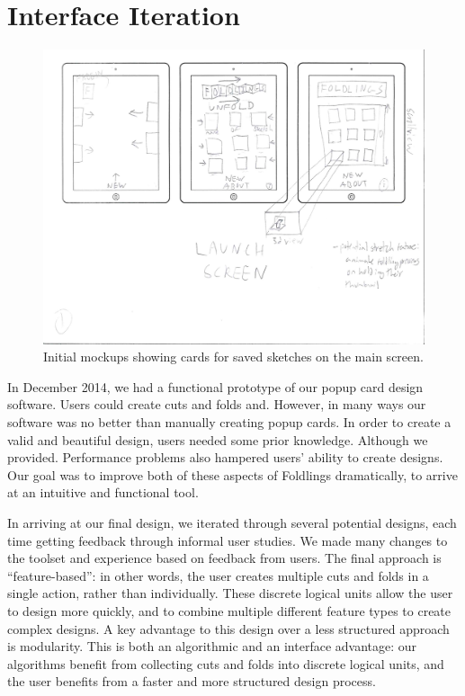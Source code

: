 \section{Interface Iteration}\label{interface-iteration}

\begin{figure}[htbp]
\centering
\includegraphics{figures/90_Appendix_UI_Mockups/001.png}
\caption{Initial mockups showing cards for saved sketches on the main
screen.}
\end{figure}

In December 2014, we had a functional prototype of our popup card design
software. Users could create cuts and folds and. However, in many ways
our software was no better than manually creating popup cards. In order
to create a valid and beautiful design, users needed some prior
knowledge. Although we provided. Performance problems also hampered
users' ability to create designs. Our goal was to improve both of these
aspects of Foldlings dramatically, to arrive at an intuitive and
functional tool.

In arriving at our final design, we iterated through several potential
designs, each time getting feedback through informal user studies. We
made many changes to the toolset and experience based on feedback from
users. The final approach is ``feature-based'': in other words, the user
creates multiple cuts and folds in a single action, rather than
individually. These discrete logical units allow the user to design more
quickly, and to combine multiple different feature types to create
complex designs. A key advantage to this design over a less structured
approach is modularity. This is both an algorithmic and an interface
advantage: our algorithms benefit from collecting cuts and folds into
discrete logical units, and the user benefits from a faster and more
structured design process.

